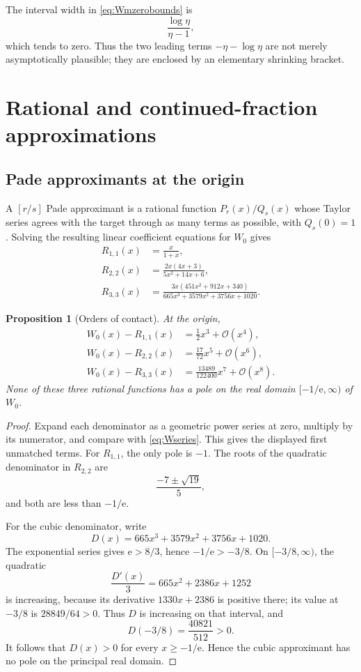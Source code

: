 \documentclass[11pt]{article}
\newtheorem{proposition}[theorem]{Proposition}
\theoremstyle{remark}
\newcommand{\Wz}{W_0}
\newcommand{\ee}{\mathrm e}
\newcommand{\bigO}{\mathcal O}
\begin{document}
The interval width in \eqref{eq:Wmzerobounds} is
\[
       \frac{\log\eta}{\eta-1},
\]
which tends to zero.  Thus the two leading terms
\(-\eta-\log\eta\) are not merely asymptotically plausible; they are enclosed
by an elementary shrinking bracket.

\section{Rational and continued-fraction approximations}\label{sec:rational}

\subsection{Pade approximants at the origin}

A \([r/s]\) Pade approximant is a rational function \(P_r(x)/Q_s(x)\)
whose Taylor series agrees with the target through as many terms as possible,
with \(Q_s(0)=1\).  Solving the resulting linear coefficient equations for
\(\Wz\) gives
\begin{align}
 R_{1,1}(x)&=\frac{x}{1+x},\label{eq:pade11}\\
 R_{2,2}(x)&=\frac{2x(4x+3)}{5x^2+14x+6},\label{eq:pade22}\\
 R_{3,3}(x)&=
 \frac{3x(451x^2+912x+340)}
 {665x^3+3579x^2+3756x+1020}.\label{eq:pade33}
\end{align}

\begin{proposition}[Orders of contact]\label{prop:pade-errors}
At the origin,
\begin{align}
 \Wz(x)-R_{1,1}(x)&=\frac12x^3+\bigO(x^4),\\
 \Wz(x)-R_{2,2}(x)&=\frac{17}{72}x^5+\bigO(x^6),\\
 \Wz(x)-R_{3,3}(x)&=\frac{13489}{122400}x^7+\bigO(x^8).
\end{align}
None of these three rational functions has a pole on the real domain
\([-1/\ee,\infty)\) of \(\Wz\).
\end{proposition}

\begin{proof}
Expand each denominator as a geometric power series at zero, multiply by its
numerator, and compare with \eqref{eq:Wseries}.  This gives the displayed
first unmatched terms.  For \(R_{1,1}\), the only pole is \(-1\).  The roots
of the quadratic denominator in \(R_{2,2}\) are
\[
       \frac{-7\pm\sqrt{19}}5,
\]
and both are less than \(-1/\ee\).

For the cubic denominator, write
\[
       D(x)=665x^3+3579x^2+3756x+1020.
\]
The exponential series gives \(\ee>8/3\), hence
\(-1/\ee>-3/8\).  On \([-3/8,\infty)\), the quadratic
\[
       \frac{D'(x)}3=665x^2+2386x+1252
\]
is increasing, because its derivative \(1330x+2386\) is positive there;
its value at \(-3/8\) is \(28849/64>0\).  Thus \(D\) is increasing on
that interval, and
\[
       D(-3/8)=\frac{40821}{512}>0.
\]
It follows that \(D(x)>0\) for every \(x\geq-1/\ee\).  Hence the cubic
approximant has no pole on the principal real domain.
\end{proof}
\end{document}
